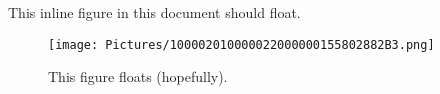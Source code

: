 This inline figure in this document should float.

\begin{figure}[h]
\centering
\texttt{[image: Pictures/100002010000022000000155802882B3.png]}
\caption{ This figure floats (hopefully). }
\end{figure}
